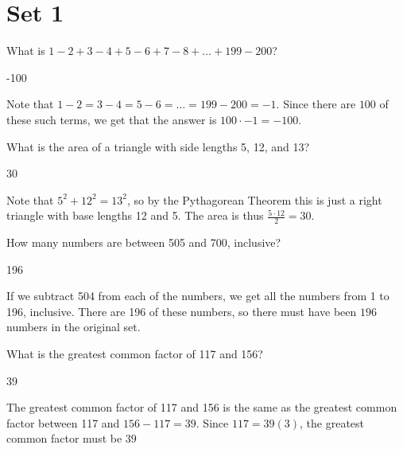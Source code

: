 \documentclass[11pt]{article}
\begin{document}
\section*{Set 1}
\begin{problem}
What is $1-2+3-4+5-6+7-8 + \dots + 199 - 200$?
\end{problem}

\begin{answer}
-100
\end{answer}

\begin{solution}
Note that $1-2=3-4=5-6=\dots=199-200=-1$. Since there are $100$ of these such terms, we get that the answer is $100\cdot -1 = \boxed{-100}$.
\end{solution}

\begin{problem}
What is the area of a triangle with side lengths 5, 12, and 13?
\end{problem}

\begin{answer}
30
\end{answer}

\begin{solution}
Note that $5^2+12^2=13^2$, so by the Pythagorean Theorem this is just a right triangle with base lengths 12 and 5.  The area is thus $\frac{5\cdot 12}{2}=\boxed{30}$.
\end{solution}

\begin{problem}
How many numbers are between 505 and 700, inclusive?
\end{problem}

\begin{answer}
196
\end{answer}

\begin{solution}
If we subtract 504 from each of the numbers, we get all the numbers from 1 to 196, inclusive. There are 196 of these numbers, so there must have been $\boxed{196}$ numbers in the original set.
\end{solution}

\begin{problem}
What is the greatest common factor of 117 and 156?
\end{problem}

\begin{answer}
39
\end{answer}

\begin{solution}
The greatest common factor of 117 and 156 is the same as the greatest common factor between 117 and $156-117=39$. Since $117=39(3)$, the greatest common factor must be $\boxed{39}$
\end{solution}
\newpage
\end{document}
